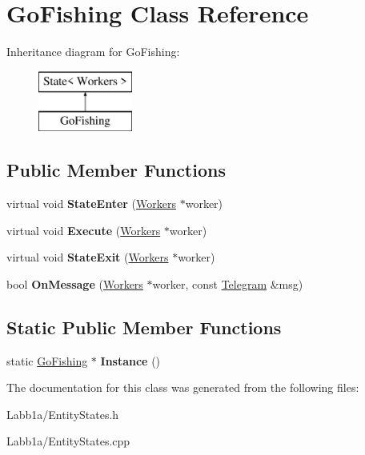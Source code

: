 \hypertarget{class_go_fishing}{}\section{Go\+Fishing Class Reference}
\label{class_go_fishing}
Inheritance diagram for Go\+Fishing\+:\begin{figure}[H]
\begin{center}
\leavevmode
\includegraphics[height=2.000000cm]{class_go_fishing}
\end{center}
\end{figure}
\subsection*{Public Member Functions}
\begin{DoxyCompactItemize}
\item 
\hypertarget{class_go_fishing_a520b14116f317b4ab51f58bd5bd451e1}{}virtual void {\bfseries State\+Enter} (\hyperlink{class_workers}{Workers} $\ast$worker)\label{class_go_fishing_a520b14116f317b4ab51f58bd5bd451e1}

\item 
\hypertarget{class_go_fishing_aaa681dde7d4618c9232b2884b8d14f03}{}virtual void {\bfseries Execute} (\hyperlink{class_workers}{Workers} $\ast$worker)\label{class_go_fishing_aaa681dde7d4618c9232b2884b8d14f03}

\item 
\hypertarget{class_go_fishing_a27ca60ebcd6d2a42b09f75f859f71ea5}{}virtual void {\bfseries State\+Exit} (\hyperlink{class_workers}{Workers} $\ast$worker)\label{class_go_fishing_a27ca60ebcd6d2a42b09f75f859f71ea5}

\item 
\hypertarget{class_go_fishing_abce7a197684866e0c3851eff9d31694a}{}bool {\bfseries On\+Message} (\hyperlink{class_workers}{Workers} $\ast$worker, const \hyperlink{struct_telegram}{Telegram} \&msg)\label{class_go_fishing_abce7a197684866e0c3851eff9d31694a}

\end{DoxyCompactItemize}
\subsection*{Static Public Member Functions}
\begin{DoxyCompactItemize}
\item 
\hypertarget{class_go_fishing_a8309a9bcbf5de86c6e782ab66b088450}{}static \hyperlink{class_go_fishing}{Go\+Fishing} $\ast$ {\bfseries Instance} ()\label{class_go_fishing_a8309a9bcbf5de86c6e782ab66b088450}

\end{DoxyCompactItemize}


The documentation for this class was generated from the following files\+:\begin{DoxyCompactItemize}
\item 
Labb1a/Entity\+States.\+h\item 
Labb1a/Entity\+States.\+cpp\end{DoxyCompactItemize}
